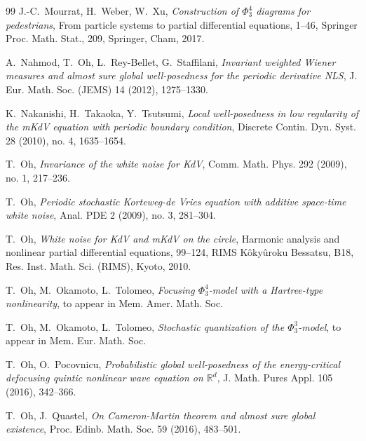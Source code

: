 \documentclass[letterpaper, 11pt,  reqno]{amsart}
\newcommand{\1}{\hspace{0.5mm}\text{I}\hspace{0.5mm}}
\newcommand{\R}{\mathbb{R}}
\numberwithin{equation}{section}
\numberwithin{theorem}{section}
\begin{document}
\begin{thebibliography}{99}
J.-C.~Mourrat, H.~Weber, W.~Xu,
{\it Construction of $\Phi^4_3$ diagrams for pedestrians},
 From particle systems to partial differential equations, 1--46, Springer Proc. Math. Stat., 209, Springer, Cham, 2017. 


A.~Nahmod, T.~Oh, L.~Rey-Bellet, G.~Staffilani,
{\it  Invariant weighted Wiener measures and almost sure global well-posedness for the periodic derivative NLS}, 
J. Eur. Math. Soc. (JEMS) 14 (2012), 1275--1330. 


K.~Nakanishi, H.~Takaoka, Y.~Tsutsumi, 
{\it Local well-posedness in low regularity of the mKdV equation with periodic boundary condition},
 Discrete Contin. Dyn. Syst. 28 (2010), no. 4, 1635--1654. 
 
% 
%
T.~Oh,
{\it Invariance of the white noise for KdV},
Comm. Math. Phys. 292 (2009), no. 1, 217--236.




T.~Oh, 
{\it Periodic stochastic Korteweg-de Vries equation with additive space-time white noise}, 
Anal. PDE 2 (2009), no. 3, 281--304. 




T.~Oh,
{\it White noise for KdV and mKdV on the circle},
Harmonic analysis and nonlinear partial differential equations, 99--124, 
RIMS K\^oky\^uroku Bessatsu, B18, Res. Inst. Math. Sci. (RIMS), Kyoto, 2010.


T.~Oh, M.~Okamoto, L.~Tolomeo,
{\it Focusing $\Phi^4_3$-model with a Hartree-type nonlinearity}, to appear in Mem. Amer. Math. Soc. 

T.~Oh, M.~Okamoto, L.~Tolomeo,
{\it Stochastic quantization of the $\Phi^3_3$-model}, 
 to appear in Mem. Eur. Math. Soc.

%
%
%


T.~Oh, O.~Pocovnicu,
{\it  Probabilistic global well-posedness of the energy-critical defocusing quintic nonlinear wave equation on $\R^d$}, J. Math. Pures Appl. 105 (2016), 342--366. 



T.~Oh, J.~Quastel,
{\it  On Cameron-Martin theorem and almost sure global existence}, 
Proc. Edinb. Math. Soc. 59 (2016), 483--501. 



\end{thebibliography}
\end{document}
